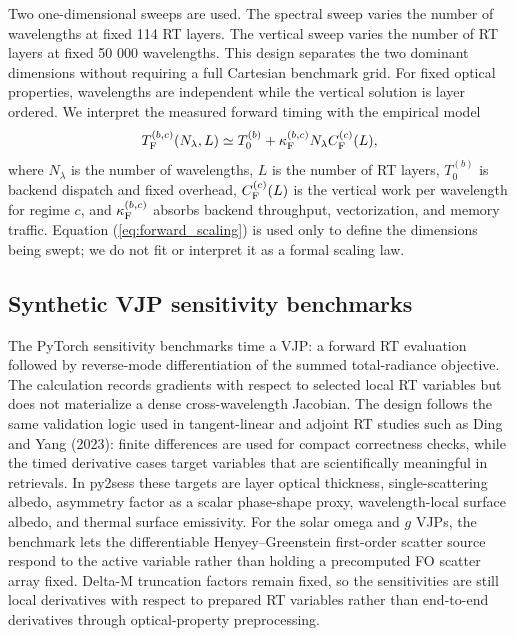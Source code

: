 \documentclass[gmd, manuscript]{copernicus}
\begin{document}
Two one-dimensional sweeps are used.  The spectral sweep varies the number of
wavelengths at fixed 114 RT layers.  The vertical sweep varies the number of RT layers
at fixed 50 000 wavelengths.  This design separates the two dominant dimensions without
requiring a full Cartesian benchmark grid.  For fixed optical properties, wavelengths
are independent while the vertical solution is layer ordered.  We interpret the
measured forward timing with the empirical model
\begin{equation}
  T_{\rm F}^{(b,c)}(N_\lambda,L)
  \simeq
  T_0^{(b)}
  + \kappa_{\rm F}^{(b,c)} N_\lambda C_{\rm F}^{(c)}(L),
  \label{eq:forward_scaling}
\end{equation}
where $N_\lambda$ is the number of wavelengths, $L$ is the number of RT layers,
$T_0^{(b)}$ is backend dispatch and fixed overhead, $C_{\rm F}^{(c)}(L)$ is the
vertical work per wavelength for regime $c$, and $\kappa_{\rm F}^{(b,c)}$ absorbs
backend throughput, vectorization, and memory traffic.  Equation
(\ref{eq:forward_scaling}) is used only to define the dimensions being swept; we do not
fit or interpret it as a formal scaling law.

\subsection{Synthetic VJP sensitivity benchmarks}

The PyTorch sensitivity benchmarks time a VJP: a forward RT evaluation followed by
reverse-mode differentiation of the summed total-radiance objective.  The calculation
records gradients with respect to selected local RT variables but does not materialize
a dense cross-wavelength Jacobian.  The design follows the same validation logic used
in tangent-linear and adjoint RT studies such as Ding and Yang (2023): finite
differences are used for compact correctness checks, while the timed derivative cases
target variables that are scientifically meaningful in retrievals.  In py2sess these
targets are layer optical thickness, single-scattering albedo, asymmetry factor
as a scalar phase-shape proxy, wavelength-local surface albedo, and thermal surface
emissivity.  For the solar omega and $g$ VJPs, the benchmark lets the differentiable
Henyey--Greenstein first-order scatter source respond to the active variable rather
than holding a precomputed FO scatter array fixed.  Delta-M truncation factors remain
fixed, so the sensitivities are still local derivatives with respect to prepared RT
variables rather than end-to-end derivatives through optical-property preprocessing.
\end{document}
